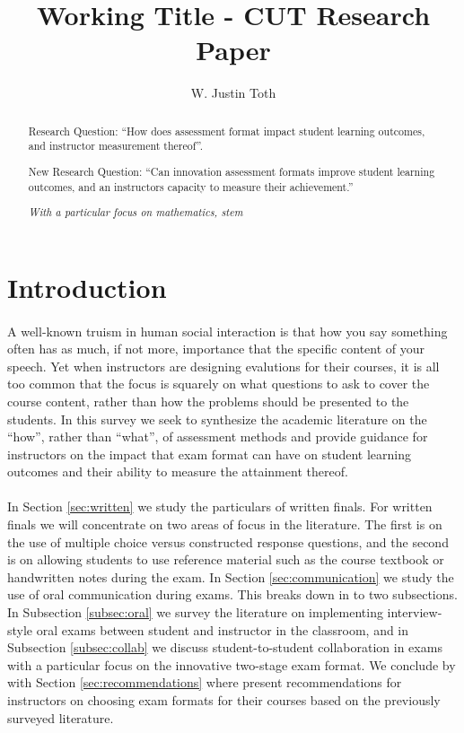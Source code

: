 \documentclass[12pt]{article}
\title{Working Title - CUT Research Paper}
\author{W. Justin Toth}
\begin{document}
\maketitle
\begin{abstract}
Research Question: ``How does assessment format impact student learning outcomes, and instructor measurement thereof''.

New Research Question: ``Can innovation assessment formats improve student learning outcomes, and an instructors capacity to measure their achievement.''

\textit{With a particular focus on mathematics, stem}
\end{abstract}
\tableofcontents
\section{Introduction}

\paragraph{}
A well-known truism in human social interaction is that how you say something often has as much, if not more, importance that the specific content of your speech. Yet when instructors are designing evalutions for their courses, it is all too common that the focus is squarely on what questions to ask to cover the course content, rather than how the problems should be presented to the students. In this survey we seek to synthesize the academic literature on the ``how'', rather than ``what'', of assessment methods and provide guidance for instructors on the impact that exam format can have on student learning outcomes and their ability to measure the attainment thereof.
\paragraph{}
In Section \ref{sec:written} we study the particulars of written finals. For written finals we will concentrate on two areas of focus in the literature. The first is on the use of multiple choice versus constructed response questions, and the second is on allowing students to use reference material such as the course textbook or handwritten notes during the exam. In Section \ref{sec:communication} we study the use of oral communication during exams. This breaks down in to two subsections. In Subsection \ref{subsec:oral} we survey the literature on implementing interview-style oral exams  between student and instructor in the classroom, and in Subsection \ref{subsec:collab} we discuss student-to-student collaboration in exams with a particular focus on the innovative two-stage exam format. We conclude by with Section \ref{sec:recommendations} where present recommendations for instructors on choosing exam formats for their courses based on the previously surveyed literature.
\end{document}
